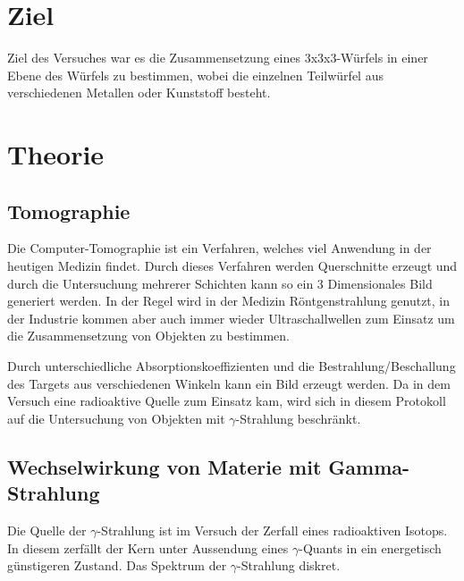 \section{Ziel}
Ziel des Versuches war es die Zusammensetzung eines 3x3x3-Würfels in einer Ebene des Würfels zu bestimmen, wobei die einzelnen Teilwürfel aus verschiedenen Metallen oder Kunststoff besteht. 

\section{Theorie}
\subsection{Tomographie}
Die Computer-Tomographie ist ein Verfahren, welches viel Anwendung in der heutigen Medizin findet.
Durch dieses Verfahren werden Querschnitte erzeugt und durch die Untersuchung mehrerer Schichten kann so ein 3 Dimensionales Bild generiert werden. In der Regel wird
in der Medizin Röntgenstrahlung genutzt, in der Industrie kommen aber auch immer wieder Ultraschallwellen zum Einsatz um die Zusammensetzung von Objekten zu bestimmen.

\noindent
Durch unterschiedliche Absorptionskoeffizienten und die Bestrahlung/Beschallung des Targets aus verschiedenen Winkeln kann ein Bild erzeugt werden. Da in dem Versuch
eine radioaktive Quelle zum Einsatz kam, wird sich in diesem Protokoll auf die Untersuchung von Objekten mit $\gamma$-Strahlung beschränkt.

\subsection{Wechselwirkung von Materie mit Gamma-Strahlung}
Die Quelle der $\gamma$-Strahlung ist im Versuch der Zerfall eines radioaktiven Isotops. In diesem zerfällt
der Kern unter Aussendung eines $\gamma$-Quants in ein energetisch günstigeren Zustand. Das
Spektrum der $\gamma$-Strahlung diskret.

